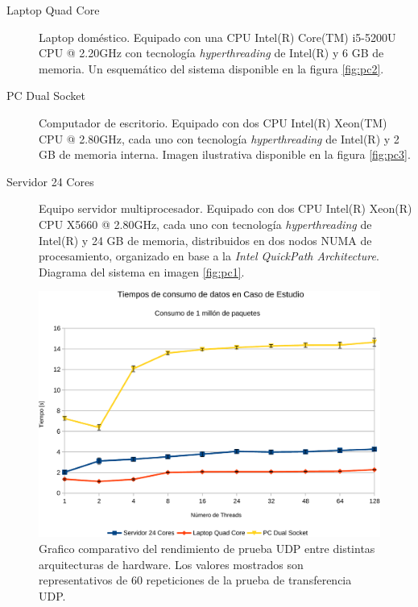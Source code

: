\begin{description}
\item[Laptop Quad Core] Laptop doméstico. Equipado con una CPU Intel(R) Core(TM) i5-5200U CPU @ 2.20GHz con tecnología \emph{hyperthreading} de Intel(R) y 6 GB de memoria. Un esquemático del sistema disponible en la figura \ref{fig:pc2}.
\item[PC Dual Socket] Computador de escritorio. Equipado con dos CPU Intel(R) Xeon(TM) CPU @ 2.80GHz, cada uno con tecnología \emph{hyperthreading} de Intel(R) y 2 GB de memoria interna. Imagen ilustrativa disponible en la figura \ref{fig:pc3}.
\item[Servidor 24 Cores] Equipo servidor multiprocesador. Equipado con dos CPU Intel(R) Xeon(R) CPU X5660 @ 2.80GHz, cada uno con tecnología \emph{hyperthreading} de Intel(R) y 24 GB de memoria, distribuidos en dos nodos NUMA de procesamiento, organizado en base a la \emph{Intel QuickPath Architecture}. Diagrama del sistema en imagen \ref{fig:pc1}.
\end{description}

\begin{figure}[h!]
	\centering
	\includegraphics[scale=0.5]{resultados/transferenciaUDP1-crop.pdf}
	\caption{Grafico comparativo del rendimiento de prueba UDP entre distintas arquitecturas de hardware. Los valores mostrados son representativos de 60 repeticiones de la prueba de transferencia UDP.}
	\label{fig:tests_arch}
\end{figure}

